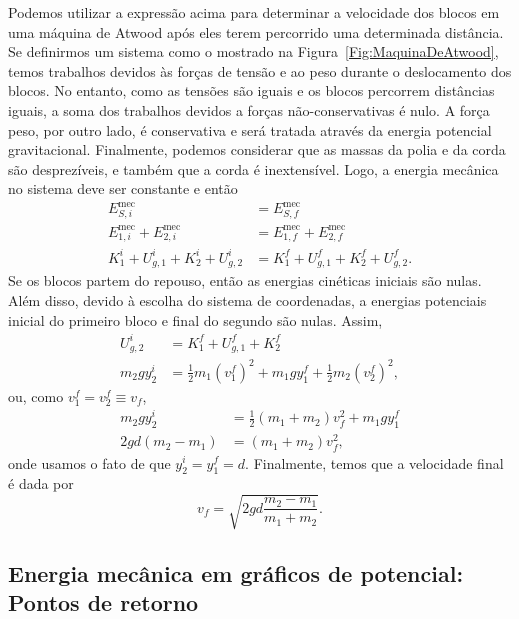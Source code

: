 Podemos utilizar a expressão acima para determinar a velocidade dos blocos em uma máquina de Atwood após eles terem percorrido uma determinada distância. Se definirmos um sistema como o mostrado na Figura~\ref{Fig:MaquinaDeAtwood}, temos trabalhos devidos às forças de tensão e ao peso durante o deslocamento dos blocos. No entanto, como as tensões são iguais e os blocos percorrem distâncias iguais, a soma dos trabalhos devidos a forças não-conservativas é nulo. A força peso, por outro lado, é conservativa e será tratada através da energia potencial gravitacional. Finalmente, podemos considerar que as massas da polia e da corda são desprezíveis, e também que a corda é inextensível. Logo, a energia mecânica no sistema deve ser constante e então
\begin{align}
    E_{S,i}^{\text{mec}} &= E_{S,f}^{\text{mec}} \\
    E_{1,i}^{\text{mec}} + E_{2,i}^{\text{mec}} &= E_{1,f}^{\text{mec}} + E_{2,f}^{\text{mec}} \\
    K_1^i + U_{g, 1}^i + K_2^i + U_{g, 2}^i &= K_1^f + U_{g, 1}^f + K_2^f + U_{g, 2}^f.
\end{align}
%
Se os blocos partem do repouso, então as energias cinéticas iniciais são nulas. Além disso, devido à escolha do sistema de coordenadas, a energias potenciais inicial do primeiro bloco  e final do segundo são nulas. Assim,
\begin{align}
    U_{g, 2}^i &= K_1^f + U_{g, 1}^f + K_2^f \\
    m_2gy_2^i &= \frac{1}{2} m_1 (v_1^f)^2 + m_1gy_1^f + \frac{1}{2} m_2 (v_2^f)^2,
\end{align}
%
ou, como $v_1^f = v_2^f \equiv v_f$,
\begin{align}
    m_2gy_2^i &= \frac{1}{2} (m_1 + m_2) v_f^2 + m_1gy_1^f \\
    2gd(m_2-m_1) &= (m_1+m_2) v_f^2,
\end{align}
%
onde usamos o fato de que $y_2^i = y_1^f = d$. Finalmente, temos que a velocidade final é dada por
\begin{equation}
    v_f = \sqrt{2gd\frac{m_2-m_1}{m_1+m_2}}.
\end{equation}

\subsection{Energia mecânica em gráficos de potencial: Pontos de retorno}


